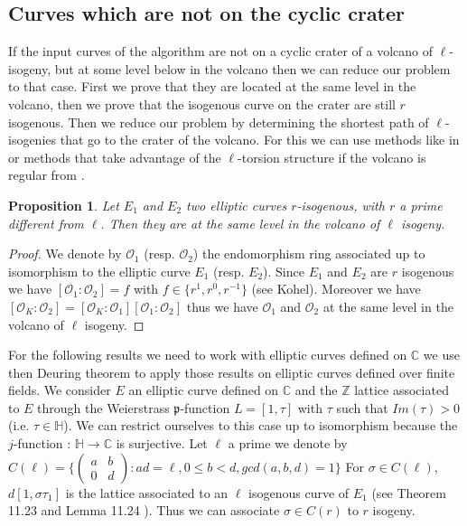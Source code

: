 \documentclass{lms}
\newtheorem{prop}[thm]{Proposition}
\begin{document}
  \subsection{Curves which are not on the cyclic crater}

If the input curves of the algorithm are not on a cyclic crater of a volcano of $\ell$-isogeny, but at some level below in the volcano then we can reduce our problem to that case. First we prove that they are located at the same level in the volcano, then we prove that the isogenous curve on the crater are still $r$ isogenous. Then we reduce our problem by determining the shortest path of $\ell$-isogenies that go to the crater of the volcano. For this we can use methods like in \cite{DBLP:journals/amc/MiretMSTV06} or methods that take advantage of the $\ell$-torsion structure if the volcano is regular from \cite{DBLP:journals/moc/MiretMRV05}.
  
\begin{prop}
Let $E_1$ and $E_2$ two elliptic curves $r$-isogenous, with $r$ a prime different from $\ell$. Then they are at the same level in the volcano of $\ell$ isogeny.
\end{prop}

\begin{proof}
We denote by $\mathcal{O}_1$ (resp. $\mathcal{O}_2$) the endomorphism ring associated up to isomorphism to the elliptic curve $E_1$ (resp. $E_2$). Since $E_1$ and $E_2$ are $r$ isogenous we have $[\mathcal{O}_1:\mathcal{O}_2]=f$ with $f \in \{r^1,r^0,r^{-1}\}$ (see Kohel). Moreover we have $[\mathcal{O}_K:\mathcal{O}_2]=[\mathcal{O}_K:\mathcal{O}_1][\mathcal{O}_1:\mathcal{O}_2]$ thus we have $\mathcal{O}_1$ and $\mathcal{O}_2$ at the same level in the volcano of $\ell$ isogeny.
\end{proof}  

For the following results we need to work with elliptic curves defined on $\mathbb{C}$ we use then Deuring theorem to apply those results on elliptic curves defined over finite fields.
We consider $E$ an elliptic curve defined on $\mathbb{C}$ and the $\mathbb{Z}$ lattice associated to $E$ through the Weierstrass $\mathfrak{p}$-function $L=[1,\tau]$ with $\tau$ such that $Im(\tau)>0$(i.e. $\tau \in \mathbb{H}$). We can restrict ourselves to this case up to isomorphism because the $j$-function : $\mathbb{H} \rightarrow \mathbb{C}$ is surjective. Let $\ell$ a prime we denote by
$C(\ell)=\{\left(\begin{array}{cc}
a & b\\
0 & d
\end{array}\right): ad= \ell,0\leqslant b <d, gcd(a,b,d)=1\}$
 For $\sigma \in C(\ell)$, $d[1,\sigma \tau_1]$ is the lattice associated to an $\ell$ isogenous curve of $E_1$ (see Theorem 11.23 and Lemma 11.24 \cite{Cox89}). Thus we can associate $\sigma \in C(r)$ to $r$ isogeny.
\end{document}
